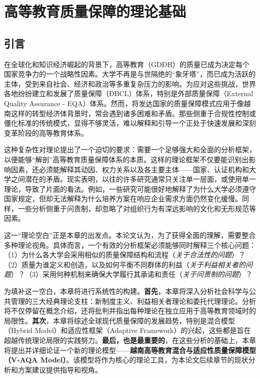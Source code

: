 
\chapter{高等教育质量保障的理论基础}
\label{chap:ly_luan}

\section*{引言}

在全球化和知识经济崛起的背景下，高等教育（GDĐH）的质量已成为决定每个国家竞争力的一个战略性因素。大学不再是与世隔绝的“象牙塔”，而已成为活跃的主体，受到来自社会、经济和政治等多重复杂压力的影响。为应对这些挑战，世界各地纷纷建立和发展了质量保障（ĐBCL）体系，特别是外部质量保障（External Quality Assurance - EQA）体系。然而，将发达国家的质量保障模式应用于像越南这样的转型经济体背景时，常会遇到诸多困难和矛盾。那些侧重于合规性控制或僵化标准的传统模式，显得不够灵活，难以解释和引导一个正处于快速发展和深刻变革阶段的高等教育体系。

这种复杂性对理论提出了一个迫切的要求：需要一个足够强大和全面的分析框架，以便能够“解剖”高等教育质量保障体系的本质。这样的理论框架不仅要能识别出影响因素，还必须能解释其动因、权力关系以及各主要主体——国家、认证机构和大学之间潜在的矛盾。现实表明，以往的许多研究通常只关注单一层面，或使用单一理论，导致了片面的看法。例如，一些研究可能很好地解释了为什么大学必须遵守国家规定，但却无法解释为什么培养方案在响应企业需求方面仍然变化缓慢。同样，一些分析侧重于问责制，却忽略了对组织行为有深远影响的文化和无形规范等因素。

这一“理论空白”正是本章的出发点。本论文认为，为了获得全面的理解，需要整合多种理论视角。具体而言，一个有效的分析框架必须能够同时解释三个核心问题：（1）为什么各大学会采用相似的质量保障结构和流程（\textit{关于合法性的问题}）？（2）质量为谁定义和创造，以及如何平衡不同群体的利益（\textit{关于利益相关者的问题}）？（3）采用何种机制来确保大学履行其承诺和责任（\textit{关于问责制的问题}）？

为填补这一空白，本章将进行系统性的构建。\textbf{首先}，本章将深入分析社会科学与公共管理的三大经典理论支柱：新制度主义、利益相关者理论和委托代理理论。分析将不仅停留在概念介绍，还将批判并指出每种理论在独立应用于高等教育领域时的局限性。\textbf{其次}，本章将综述全球现代质量保障的发展趋势，特别是混合模型（Hybrid Model）和适应性框架（Adaptive Framework）的兴起，这些都是旨在超越传统理论局限的实践努力。\textbf{最后，也是最重要的}，在这些分析的基础上，本章将提出并详细论证一个新的理论模型——\textbf{越南高等教育混合与适应性质量保障模型（V-AQA Model）}。该模型将作为核心的理论工具，为本论文后续章节的现状分析和方案建议提供指导和视角。


